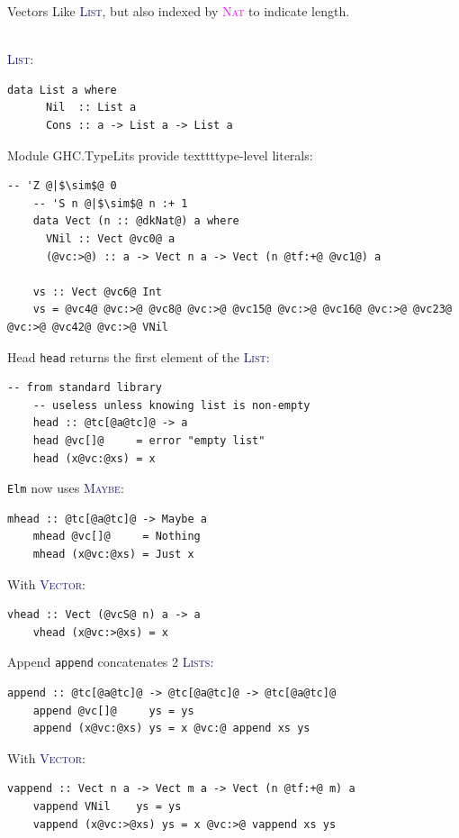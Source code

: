 \documentclass[xcolor={usenames,dvipsnames}]{beamer}
\newcommand{\htycon}[1]{\textcolor{MidnightBlue}{\textsc{#1}}}
\newcommand{\hkind}[1]{\textcolor{Fuchsia}{\textsc{#1}}}
\begin{document}
\begin{frame}[fragile]{Vectors}
  Like \htycon{List}, but also indexed by \hkind{Nat} to indicate length.

  \ \\
  \pause
  \htycon{List}:
  \begin{lstlisting}[style=hask]
    data List a where
      Nil  :: List a
      Cons :: a -> List a -> List a
  \end{lstlisting}

  \pause
  Module GHC.TypeLits provide texttt{type-level literals}:
  \begin{lstlisting}[style=hask]
    -- 'Z @|$\sim$@ 0
    -- 'S n @|$\sim$@ n :+ 1
    data Vect (n :: @dkNat@) a where
      VNil :: Vect @vc0@ a
      (@vc:>@) :: a -> Vect n a -> Vect (n @tf:+@ @vc1@) a

    vs :: Vect @vc6@ Int
    vs = @vc4@ @vc:>@ @vc8@ @vc:>@ @vc15@ @vc:>@ @vc16@ @vc:>@ @vc23@ @vc:>@ @vc42@ @vc:>@ VNil
  \end{lstlisting}
\end{frame}

\begin{frame}[fragile]{Head}
  \texttt{head} returns the first element of the \htycon{List}:
  \begin{lstlisting}[style=hask]
    -- from standard library
    -- useless unless knowing list is non-empty
    head :: @tc[@a@tc]@ -> a
    head @vc[]@     = error "empty list"
    head (x@vc:@xs) = x
  \end{lstlisting}

  \pause
  \texttt{Elm} now uses \htycon{Maybe}:
  \begin{lstlisting}[style=hask]
    mhead :: @tc[@a@tc]@ -> Maybe a
    mhead @vc[]@     = Nothing
    mhead (x@vc:@xs) = Just x
  \end{lstlisting}

  \pause
  With \htycon{Vector}:
  \begin{lstlisting}[style=hask]
    vhead :: Vect (@vcS@ n) a -> a
    vhead (x@vc:>@xs) = x
  \end{lstlisting}
\end{frame}

\begin{frame}[fragile]{Append}
  \texttt{append} concatenates 2 \htycon{Lists}:
  \begin{lstlisting}[style=hask]
    append :: @tc[@a@tc]@ -> @tc[@a@tc]@ -> @tc[@a@tc]@
    append @vc[]@     ys = ys
    append (x@vc:@xs) ys = x @vc:@ append xs ys
  \end{lstlisting}

  \pause
  With \htycon{Vector}:
  \begin{lstlisting}[style=hask]
    vappend :: Vect n a -> Vect m a -> Vect (n @tf:+@ m) a
    vappend VNil    ys = ys
    vappend (x@vc:>@xs) ys = x @vc:>@ vappend xs ys
  \end{lstlisting}
\end{frame}
\end{document}
